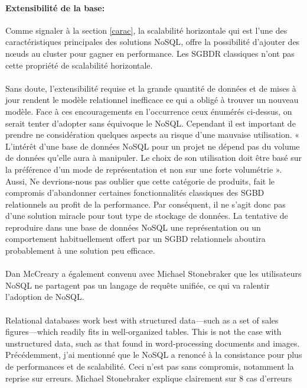 \paragraph{Extensibilité de la base:} Comme signaler à la section \ref{carac}, 
la scalabilité horizontale qui est l'une des caractéristiques principales 
des solutions \textsf{NoSQL}, offre la possibilité 
d'ajouter des nœuds au cluster pour gagner en performance. Les \textsf{SGBDR} classiques 
n'ont pas cette propriété de scalabilité horizontale.
\\ 
\\ 
Sans doute, l'extensibilité requise et la grande quantité de données
et de mises à jour rendent le modèle relationnel inefficace ce qui a
obligé à trouver un nouveau modèle.  Face à ces encouragements en
l'occurrence ceux énumérés ci-dessus, on serait tenter d'adopter sans
équivoque le \textsf{NoSQL}. Cependant il est important de prendre ne
considération quelques aspects au risque d'une mauvaise utilisation. «
L’intérêt d’une base de données \textsf{NoSQL} pour un projet ne
dépend pas du volume de données qu’elle aura à manipuler. Le choix de
son utilisation doit être basé sur la préférence d’un mode de
représentation et non sur une forte volumétrie
»\cite{NoSQLeurope}. Aussi, Ne devrions-nous pas oublier que cette
catégorie de produits, fait le compromis d'abandonner certaines
fonctionnalités classiques des \textsf{SGBD} relationnels au profit de
la performance. Par conséquent, il ne s’agit donc pas d’une solution
miracle pour tout type de stockage de données.  La tentative de
reproduire dans une base de données \textsf{NoSQL} une représentation
ou un comportement habituellement offert par un \textsf{SGBD}
relationnels aboutira probablement à une solution peu efficace.
\\
\\
Dan McCreary a également convenu avec Michael Stonebraker que les
utilisateurs NoSQL ne partagent pas un langage de requête unifiée, ce
qui va ralentir l'adoption de NoSQL\cite{SergeLeblal}.
\\
\\
Relational databases work best with structured data—such as a set of
sales figures—which readily fits in well-organized tables. This is not
the case with unstructured data, such as that found in word-processing
documents and images\cite{NealLeavitt}.
\newpage
\noindent Précédemment, j'ai mentionné que le \textsf{NoSQL} a renoncé à la consistance
pour plus de performances et de scalabilité. Ceci n'est pas sans compromis, notamment 
la reprise sur erreurs. \textsf{Michael Stonebraker} explique clairement sur 8 cas d'erreurs 
